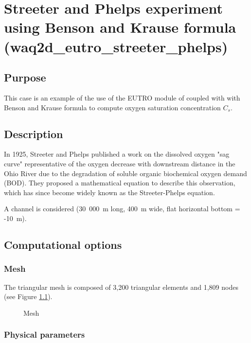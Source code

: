 \chapter{Streeter and Phelps experiment using Benson and Krause formula
(waq2d\_eutro\_streeter\_phelps)}

\section{Purpose}

This case is an example of the use of the EUTRO module of \waqtel coupled with
 with Benson and Krause formula to compute oxygen saturation
concentration $C_s$.

\section{Description}

In 1925, Streeter and Phelps published a work on the dissolved oxygen "sag curve"
representative of the oxygen decrease with downstream distance in the Ohio River
due to the degradation of soluble organic biochemical oxygen demand (BOD).
They proposed a mathematical equation to describe this observation, which has
since become widely known as the Streeter-Phelps equation.

A channel is considered (30~000~m long, 400~m wide, flat horizontal bottom
= -10~m).\\

\section{Computational options}

\subsection{Mesh}

The triangular mesh is composed of 3,200 triangular elements and 1,809 nodes
(see Figure \ref{fig:waq2d_eutro_streeter_phelps:mesh}).

\begin{figure}[H]
 \centering
\caption{Mesh}
 \label{fig:waq2d_eutro_streeter_phelps:mesh}
\end{figure}

\subsection{Physical parameters}

